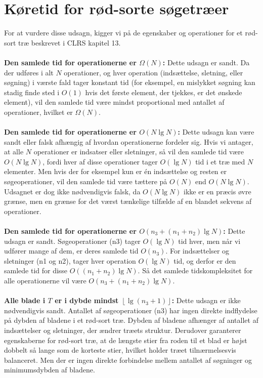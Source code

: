 \documentclass{article}
\begin{document}
\section{Køretid for rød-sorte søgetræer}
For at vurdere disse udsagn, kigger vi på de egenskaber og operationer for et rød-sort træ beskrevet i CLRS kapitel 13.
\\
\\
\textbf{Den samlede tid for operationerne er $\Omega(N)$:}
Dette udsagn er sandt. Da der udføres i alt $N$ operationer, og hver operation (indsættelse, sletning, eller søgning) i værste fald tager konstant tid (for eksempel, en mislykket søgning kan stadig finde sted i $O(1)$ hvis det første element, der tjekkes, er det ønskede element), vil den samlede tid være mindst proportional med antallet af operationer, hvilket er $\Omega(N)$.
\\
\\
\textbf{Den samlede tid for operationerne er $O(N \lg N)$:}
Dette udsagn kan være sandt eller falsk afhængig af hvordan operationerne fordeler sig. Hvis vi antager, at alle $N$ operationer er indsatser eller sletninger, så vil den samlede tid være $O(N \lg N)$, fordi hver af disse operationer tager $O(\lg N)$ tid i et træ med $N$ elementer. Men hvis der for eksempel kun er én indsættelse og resten er søgeoperationer, vil den samlede tid være tættere på $O(N)$ end $O(N \lg N)$. Udsagnet er dog ikke nødvendigvis falsk, da $O(N \lg N)$ ikke er en præcis øvre grænse, men en grænse for det værst tænkelige tilfælde af en blandet sekvens af operationer.
\\
\\
\textbf{Den samlede tid for operationerne er $O\left(n_3+\left(n_1+n_2\right) \lg N\right)$:}
Dette udsagn er sandt. Søgeoperationer (n3) tager $O(\lg N)$ tid hver, men når vi udfører mange af dem, er deres samlede tid $O(n_3)$. For indsættelser og sletninger (n1 og n2), tager hver operation $O(\lg N)$ tid, og derfor er den samlede tid for disse $O((n_1+n_2) \lg N)$. Så det samlede tidskompleksitet for alle operationerne vil være $O\left(n_3+\left(n_1+n_2\right) \lg N\right)$.
\\
\\
\textbf{Alle blade i $T$ er i dybde mindst $\left\lfloor\lg \left(n_3+1\right)\right\rfloor$:}
Dette udsagn er ikke nødvendigvis sandt. Antallet af søgeoperationer (n3) har ingen direkte indflydelse på dybden af bladene i et rød-sort træ. Dybden af bladene afhænger af antallet af indsættelser og sletninger, der ændrer træets struktur. Derudover garanterer egenskaberne for rød-sort træ, at de længste stier fra roden til et blad er højst dobbelt så lange som de korteste stier, hvilket holder træet tilnærmelsesvis balanceret. Men der er ingen direkte forbindelse mellem antallet af søgninger og minimumsdybden af bladene.
\end{document}
